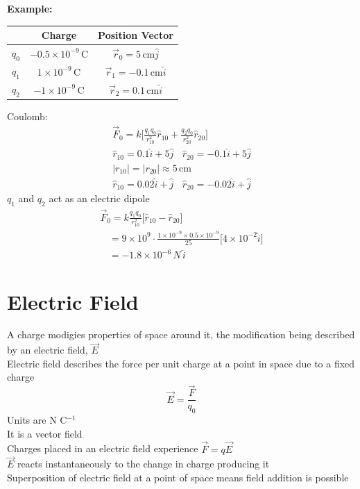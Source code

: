 \documentclass[a4paper, 11pt, fleqn, normalem]{report}
\begin{document}
\textbf{Example: }
\begin{table}[H]
    \begin{tabular}{|c|c|c|}
    \hline
    \rowcolor{lightgray} & Charge & Position Vector \\
    \hline
    $q_{0}$ & $-0.5\times10^{-9}$\,C & $\vec{r}_{0} = 5\,\text{cm}\hat{j}$\\
    \hline
    $q_{1}$ & $1\times10^{-9}$\,C & $\vec{r}_{1} = -0.1\,\text{cm}\hat{i}$\\
    \hline
    $q_{2}$ & $-1\times10^{-9}$\,C & $\vec{r}_{2} = 0.1\,\text{cm}\hat{i}$\\
    \hline
    \end{tabular}
\end{table}
Coulomb:
\begin{gather*}
    \vec{F}_{0} = k\Bigg[\frac{q_{1}q_{0}}{r_{10}^{2}}\hat{r}_{10} + \frac{q_{2}q_{0}}{r_{20}^{2}}\hat{r}_{20}\Bigg] \\
    \hat{r}_{10} = 0.1\hat{i} + 5\hat{j} ~~~~ \hat{r}_{20} = -0.1\hat{i} + 5\hat{j} \\
    |r_{10}| = |r_{20}| \approx 5\,\text{cm} \\
    \hat{r}_{10} = 0.02\hat{i} + \hat{j} ~~~~ \hat{r}_{20} = -0.02\hat{i} + \hat{j}
\end{gather*}
$q_{1}$ and $q_{2}$ act as an electric dipole
\begin{gather*}
    \vec{F}_{0} = k\frac{q_{1}q_{0}}{r_{10}^{2}}\Big[\hat{r}_{10} - \hat{r}_{20}\Big] \\
    ~~~~ = 9\times10^{9} \cdot \frac{1\times10^{-9}\times0.5\times10^{-9}}{25}\Big[4\times10^{-2}\hat{i}\Big] \\
    ~~~~ = -1.8\times10^{-6}\,N\,\hat{i}
\end{gather*}

\section{Electric Field}
A charge modigies properties of space around it, the modification being described by an electric field, $\vec{E}$ \\
Electric field describes the force per unit charge at a point in space due to a fixed charge
\begin{equation*}
    \vec{E} = \frac{\vec{F}}{q_{0}}
\end{equation*}
Units are N C$^{-1}$ \\
It is a vector field \\
Charges placed in an electric field experience $\vec{F} = q\vec{E}$ \\
$\vec{E}$ reacts instantaneously to the change in charge producing it \\
Superposition of electric field at a point of space means field addition is possible
\end{document}
